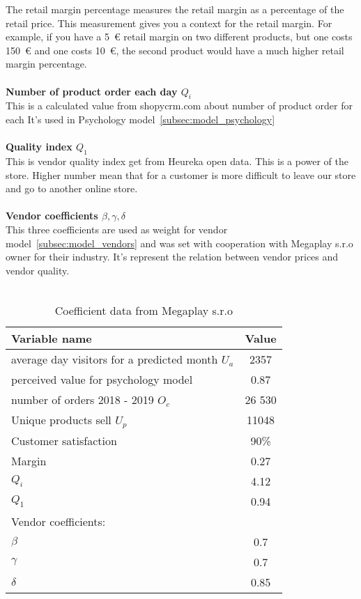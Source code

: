 The retail margin percentage measures the retail margin as a percentage of the retail price.
This measurement gives you a context for the retail margin.
For example, if you have a 5~€ retail margin on two different products, but one costs 150~€ and one costs 10~€, the second product would have a much higher retail margin percentage.\\
\\
\textbf{Number of product order each day $Q_i$}\\
This is a calculated value from shopycrm.com about number of product order for each
It's used in Psychology model~\ref{subsec:model_psychology} \\
\\
\textbf{Quality index $Q_1$}\\
This is vendor quality index get from Heureka open data.
This is a power of the store.
Higher number mean that for a customer is more difficult to leave our store and go to another online store.\\
\\
\textbf{Vendor coefficients $\beta, \gamma, \delta$} \label{vendorCoeff}\\
This three coefficients are used as weight for vendor model~\ref{subsec:model_vendors} and was set with cooperation with Megaplay s.r.o owner for their industry.
It's represent the relation between vendor prices and vendor quality.\\
\\
\begin{table}[h!]
    \begin{center}
        \begin{tabular}{ | l | c |}
            \hline
            {\textbf{Variable name}} & \textbf{Value}\\
            \hline
            average day visitors for a predicted month $U_a$& 2357 \\
            perceived value for psychology model & 0.87 \\
            number of orders 2018 - 2019 $O_c$ & 26 530 \\
            Unique products sell $U_p$ & 11048\\
            Customer satisfaction & 90\%\\
            Margin & 0.27\\
            $Q_i$ & 4.12\\
            $Q_1$ & 0.94\\
            Vendor coefficients: & \\
            $\beta$ & 0.7\\
            $\gamma$ & 0.7\\
            $\delta$ & 0.85\\
            \hline
        \end{tabular}
    \end{center}
    \caption{Coefficient data from Megaplay s.r.o}
    \label{megaplay_data}
\end{table}

